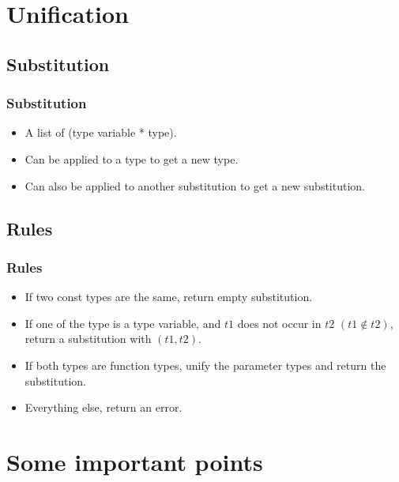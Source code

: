 \documentclass[t]{beamer}
\begin{document}
    \section{Unification}
    \subsection{Substitution}
    \begin{frame}
        \frametitle{Substitution}
        \begin{itemize}
            \item A list of (type variable * type).
            \item Can be applied to a type to get a new type.
            \item Can also be applied to another substitution to get a new substitution.
        \end{itemize}
    \end{frame}

    \subsection{Rules}
    \begin{frame}
        \frametitle{Rules}
        \begin{itemize}
            \item If two const types are the same, return empty substitution.
            \item If one of the type is a type variable, and $t1$ does not occur in $t2$ $(t1 \notin t2)$, return a substitution with $(t1, t2)$.
            \item If both types are function types, unify the parameter types and return the substitution.
            \item Everything else, return an error.
        \end{itemize}
    \end{frame}

    \section{Some important points}
\end{document}
